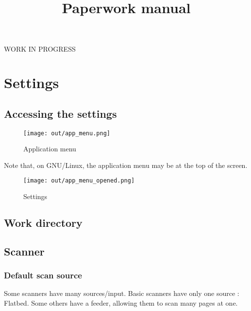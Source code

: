 \documentclass[10pt,a4paper]{article}
\date{}
\title{Paperwork manual}
\begin{document}
\maketitle

WORK IN PROGRESS

\pagebreak

\tableofcontents

\pagebreak

\section{Settings}

\subsection{Accessing the settings}

\begin{figure}[H]
\begin{centering}
\texttt{[image: out/app\_menu.png]}
\par\end{centering}
\caption{Application menu}
\end{figure}

Note that, on GNU/Linux, the application menu may be at the top of
the screen.

\begin{figure}[H]
\begin{centering}
\texttt{[image: out/app\_menu\_opened.png]}
\par\end{centering}
\caption{Settings}
\end{figure}


\subsection{Work directory}

\subsection{Scanner}

\subsubsection{Default scan source}

Some scanners have many sources/input. Basic scanners have only one
source : Flatbed. Some others have a feeder, allowing them to scan
many pages at one.
\end{document}
